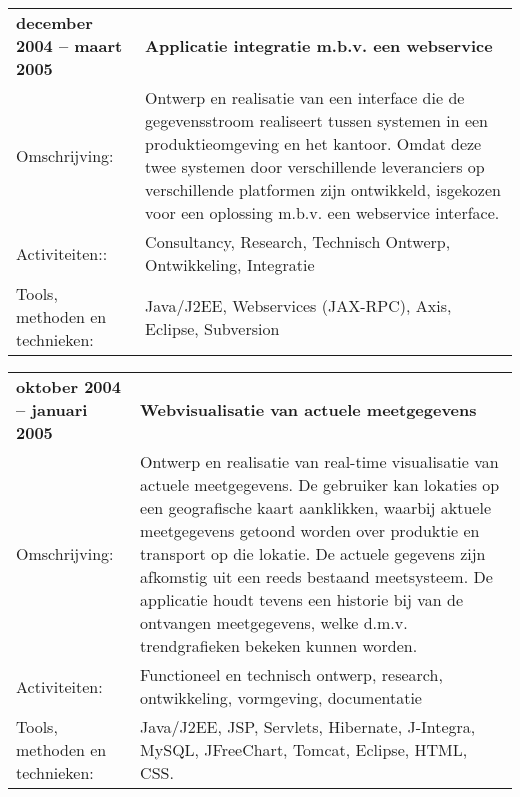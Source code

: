 \documentclass[a4paper]{article}
\newcommand{\mysql}{My\-SQL}
\newcommand{\omschrijving}{Omschrijving:}
\newcommand{\activiteiten}{Activiteiten:}
\newcommand{\tools}{Tools, methoden en technieken:}
\newcommand{\tabelh}[1]{\textbf{#1}}
\begin{document}
        \medskip
        
        \begin{tabular}{l p{10cm}}
            \tabelh{december 2004 --  maart 2005} & \tabelh{Applicatie
            integratie m.b.v. een webservice} \\
            \omschrijving &
            Ontwerp en realisatie van een interface die de gegevensstroom
            realiseert tussen systemen in een produktieomgeving en het
            kantoor.  Omdat deze twee systemen door verschillende leveranciers
            op verschillende platformen zijn ontwikkeld, isgekozen voor een
            oplossing m.b.v. een webservice interface. \\
            \activiteiten: &
            Consultancy, Research, Technisch Ontwerp, Ontwikkeling, Integratie \\
            \tools & Java/J2EE, Webservices (JAX-RPC),
            Axis, Eclipse, Subversion \\
        \end{tabular}

        \medskip
        
        \begin{tabular}{l p{10cm}}
            \tabelh{oktober 2004 -- januari 2005} & \tabelh{Webvisualisatie
            van actuele meetgegevens} \\
            \omschrijving &
            Ontwerp en realisatie van real-time visualisatie van actuele
            meetgegevens. De gebruiker kan lokaties op een geografische kaart
            aanklikken, waarbij aktuele meetgegevens getoond worden over
            produktie en transport op die lokatie. De actuele gegevens zijn
            afkomstig uit een reeds bestaand meetsysteem. De applicatie houdt
            tevens een historie bij van de ontvangen meetgegevens, welke
            d.m.v.  trendgrafieken bekeken kunnen worden. \\
            \activiteiten &
            Functioneel en technisch ontwerp, research, ontwikkeling,
            vormgeving, documentatie \\
            \tools &
            Java/J2EE,  JSP, Servlets, Hibernate, J-Integra, \mysql,
            JFree\-Chart, Tomcat, Eclipse, HTML, CSS. \\
        \end{tabular}

        \medskip
\end{document}
